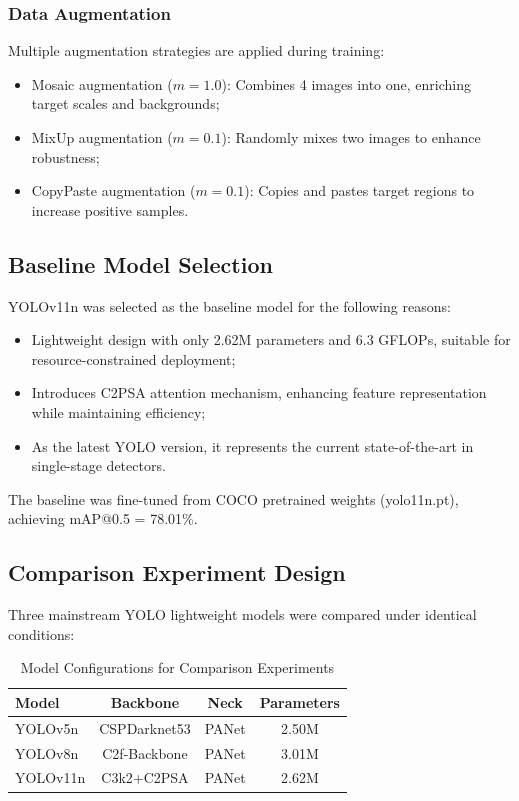 \documentclass[12pt,a4paper]{article}
\begin{document}
\subsubsection{Data Augmentation}
Multiple augmentation strategies are applied during training:
\begin{itemize}[noitemsep]
  \item Mosaic augmentation ($m=1.0$): Combines 4 images into one, enriching target scales and backgrounds;
  \item MixUp augmentation ($m=0.1$): Randomly mixes two images to enhance robustness;
  \item CopyPaste augmentation ($m=0.1$): Copies and pastes target regions to increase positive samples.
\end{itemize}

\subsection{Baseline Model Selection}

YOLOv11n was selected as the baseline model for the following reasons:
\begin{itemize}[noitemsep]
  \item Lightweight design with only 2.62M parameters and 6.3 GFLOPs, suitable for resource-constrained deployment;
  \item Introduces C2PSA attention mechanism, enhancing feature representation while maintaining efficiency;
  \item As the latest YOLO version, it represents the current state-of-the-art in single-stage detectors.
\end{itemize}

The baseline was fine-tuned from COCO pretrained weights (yolo11n.pt), achieving mAP@0.5 = 78.01\%.

\subsection{Comparison Experiment Design}

Three mainstream YOLO lightweight models were compared under identical conditions:

\begin{table}[H]
\centering
\caption{Model Configurations for Comparison Experiments}
\begin{tabular}{lccc}
\toprule
Model & Backbone & Neck & Parameters \\
\midrule
YOLOv5n & CSPDarknet53 & PANet & 2.50M \\
YOLOv8n & C2f-Backbone & PANet & 3.01M \\
YOLOv11n & C3k2+C2PSA & PANet & 2.62M \\
\bottomrule
\end{tabular}
\end{table}
\end{document}
